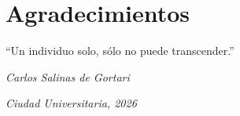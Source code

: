
\chapter*{Agradecimientos}
\epigraph{``Un individuo solo, sólo no puede transcender.''
}{\textit{Carlos Salinas de Gortari}}
\noindent 

\noindent

\begin{flushright}
\textit{Ciudad Universitaria, 2026}
\end{flushright}
 



